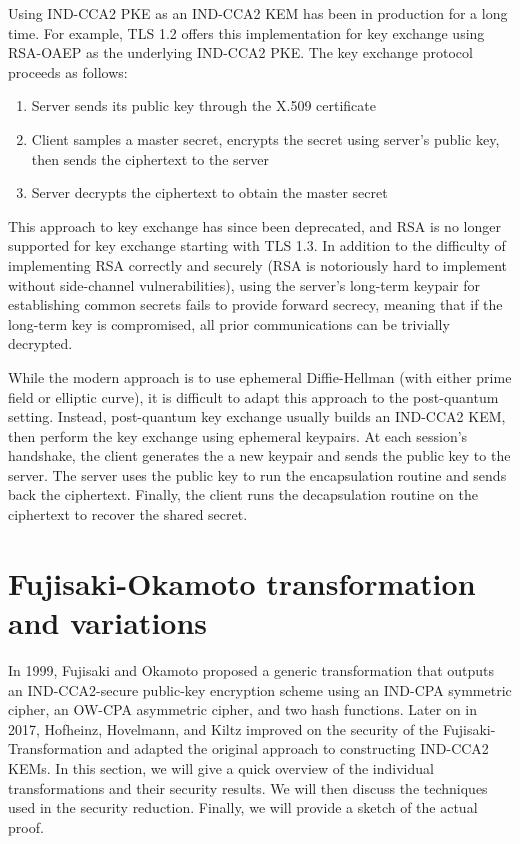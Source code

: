 \documentclass{article}
\begin{document}
    Using IND-CCA2 PKE as an IND-CCA2 KEM has been in production for a long time. For example, TLS 1.2 \cite{dierks2008rfc} offers this implementation for key exchange using RSA-OAEP\cite{bellare1995optimal} as the underlying IND-CCA2 PKE. The key exchange protocol proceeds as follows:

    \begin{enumerate}
        \item Server sends its public key through the X.509 certificate
        \item Client samples a master secret, encrypts the secret using server's public key, then sends the ciphertext to the server
        \item Server decrypts the ciphertext to obtain the master secret
    \end{enumerate}

    This approach to key exchange has since been deprecated, and RSA is no longer supported for key exchange starting with TLS 1.3. In addition to the difficulty of implementing RSA correctly and securely (RSA is notoriously hard to implement without side-channel vulnerabilities), using the server's long-term keypair for establishing common secrets fails to provide forward secrecy, meaning that if the long-term key is compromised, all prior communications can be trivially decrypted.

    While the modern approach is to use ephemeral Diffie-Hellman (with either prime field or elliptic curve), it is difficult to adapt this approach to the post-quantum setting. Instead, post-quantum key exchange usually builds an IND-CCA2 KEM, then perform the key exchange using ephemeral keypairs. At each session's handshake, the client generates the a new keypair and sends the public key to the server. The server uses the public key to run the encapsulation routine and sends back the ciphertext. Finally, the client runs the decapsulation routine on the ciphertext to recover the shared secret.

\section{Fujisaki-Okamoto transformation and variations}
In 1999, Fujisaki and Okamoto \cite{fujisaki1999secure} proposed a generic transformation that outputs an IND-CCA2-secure public-key encryption scheme using an IND-CPA symmetric cipher, an OW-CPA asymmetric cipher, and two hash functions. Later on in 2017, Hofheinz, Hovelmann, and Kiltz \cite{hofheinz2017modular} improved on the security of the Fujisaki-Transformation and adapted the original approach to constructing IND-CCA2 KEMs. In this section, we will give a quick overview of the individual transformations and their security results. We will then discuss the techniques used in the security reduction. Finally, we will provide a sketch of the actual proof.
\end{document}
